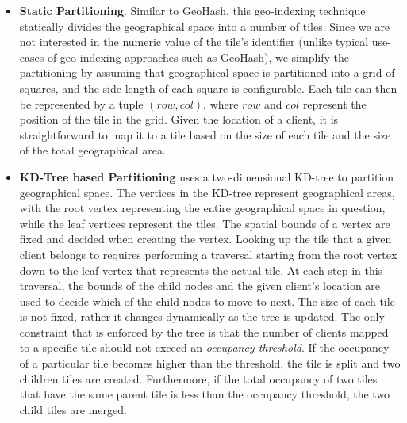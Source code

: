 \begin{itemize}
\item \textbf{Static Partitioning}. Similar to GeoHash, this geo-indexing technique statically divides the  geographical space into a number of tiles. Since we are not interested in the numeric value of the tile's identifier (unlike typical use-cases of geo-indexing approaches such as GeoHash), we simplify the partitioning by assuming that geographical space is partitioned into a grid of squares, and the side length of each square is configurable. Each tile can then be represented by a tuple $\left( row, col \right)$, where $row$ and $col$ represent the position of the tile in the grid. Given the location of a client, it is straightforward to map it to a tile based on the size of each tile and the size of the total geographical area.
\item \textbf{KD-Tree based Partitioning} uses a two-dimensional KD-tree to partition geographical space. The vertices in the KD-tree represent geographical areas, with the root vertex representing the entire geographical space in question, while the leaf vertices represent the tiles. The spatial bounds of a vertex are fixed and decided when creating the vertex. Looking up the tile that a given client belongs to requires performing a traversal starting from the root vertex down to the leaf vertex that represents the actual tile. At each step in this traversal, the bounds of the child nodes and the given client's location are used to decide which of the child nodes to move to next. The size of each tile is not fixed, rather it changes dynamically as the tree is updated. The only constraint that is enforced by the tree is that the number of clients mapped to a specific tile should not exceed an \textit{occupancy threshold}. If the occupancy of a particular tile becomes higher than the threshold, the tile is split and two children tiles are created. Furthermore, if the total occupancy of two tiles that have the same parent tile is less than the occupancy threshold, the two child tiles are merged.
\end{itemize}

